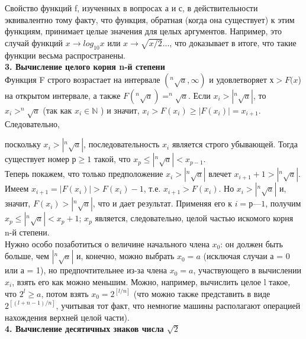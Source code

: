 \documentclass{mai_book}
\begin{document}
Свойство функций f, изученных в вопросах а и с, в действительности эквивалентно тому факту, что функция, обратная (когда она существует) к этим функциям, принимает целые значения для целых аргументов. Например, это случай функций $x \longrightarrow log_{10}x$ или $x \longrightarrow \sqrt{x/2}...$, что доказывает в итоге, что такие функции весьма распространены.\\

\noindent
\textbf{3. Вычисление целого корня n-й степени}\\

Функция F строго возрастает на интервале $(^{n}\sqrt{a}, \infty )$ и удовлетворяет $х > F(x$) на открытом интервале, а также $F(^{n}\sqrt{a}) = ^{n}\sqrt{a}$. Если $x_{i} > |^{n}\sqrt{a}|$, то $x_{i} > ^{n}\sqrt{a}$ (так как $x_{i} \in \mathbb{N}$ ) и значит, $x_{i} > F(x_{i}) \geqslant |F(x_{i})| = x_{i+1}$. Следовательно,
\newpage

\noindent
поскольку $x_{i} > |^{n}\sqrt{a}|$, последовательность $x_{i}$ является строго убывающей. Тогда существует номер $р \geqslant 1$ такой, что $x_{p} \leqslant |^{n}\sqrt{a}| < x_{p-1}$.\\

Теперь покажем, что только предположение $x_{i} > |^{n}\sqrt{a}|$ влечет $x_{i+1} + 1 > |^{n}\sqrt{a}|$. Имеем $x_{i+1} = |F(x_{i})| > F(x_{i}) - 1$, т.е. $x_{i+1} > F(x_{i})$. Но $x_{i} > |^{n}\sqrt{a}|$ и, значит, $F(x_{i}) > |^{n}\sqrt{a}|$, что и дает результат. Применяя его к $i = р — 1$, получим $x_{p} \leqslant |^{n}\sqrt{a}| < x_{p} + 1$; $x_{p}$ является, следовательно, целой частью искомого корня n-й степени.\\

Нужно особо позаботиться о величине начального члена $x_{0}$: он должен быть больше, чем $|^{n}\sqrt{a}|$ и, конечно, можно выбрать $x_{0} = a$ (исключая случаи а = 0 или а = 1), но предпочтительнее из-за члена $x_{0} = a$, участвующего в вычислении $x_{i}$, взять его как можно меньшим. Можно, например, вычислить целое l такое, что $2^{l} \geqslant a$, потом взять $x_{0} = 2^{[l/n]}$ (что можно также представить в виде $2^{[(l+n-1)/n]}$, учитывая тот факт, что немногие машины располагают операцией нахождения верхней целой части).\\

\noindent
\textbf{4. Вычисление десятичных знаков числа $\sqrt{2}$}\\
\end{document}
